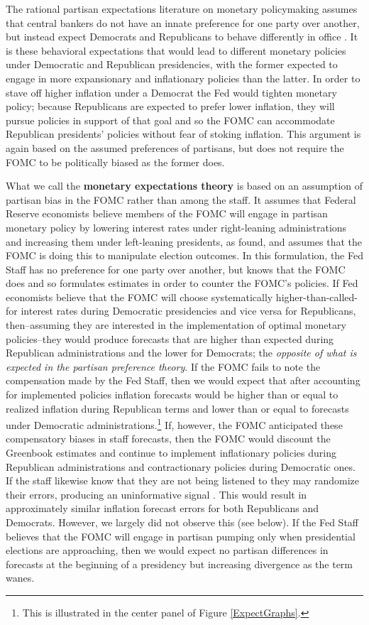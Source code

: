 \documentclass[a4paper]{article}\usepackage{graphicx, color}
\begin{document}
The rational partisan expectations literature on monetary policymaking assumes that central bankers do not have an innate preference for one party over another, but instead expect Democrats and Republicans to behave differently in office \citep{Alesina1991,Hibbs1994}. It is these behavioral expectations that would lead to different monetary policies under Democratic and Republican presidencies, with the former expected to engage in more expansionary and inflationary policies than the latter. In order to stave off higher inflation under a Democrat the Fed would tighten monetary policy; because Republicans are expected to prefer lower inflation, they will pursue policies in support of that goal and so the FOMC can accommodate Republican presidents' policies without fear of stoking inflation. This argument is again based on the assumed preferences of partisans, but does not require the FOMC to be politically biased as the former does. 

What we call the {\bf{monetary expectations theory}} is based on an assumption of partisan bias in the FOMC rather than among the staff. It assumes that Federal Reserve economists believe members of the FOMC will engage in partisan monetary policy by lowering interest rates under right-leaning administrations and increasing them under left-leaning presidents, as \cite{Clark2012} found, and assumes that the FOMC is doing this to manipulate election outcomes. In this formulation, the Fed Staff has no preference for one party over another, but knows that the FOMC does and so formulates estimates in order to counter the FOMC's policies. If Fed economists believe that the FOMC will choose systematically higher-than-called-for interest rates during Democratic presidencies and vice versa for Republicans, then--assuming they are interested in the implementation of optimal monetary policies--they would produce forecasts that are higher than expected during Republican administrations and the lower for Democrats; the {\emph{opposite of what is expected in the partisan preference theory}}. If the FOMC fails to note the compensation made by the Fed Staff, then we would expect that after accounting for implemented policies inflation forecasts would be higher than or equal to realized inflation during Republican terms and lower than or equal to forecasts under Democratic administrations.\footnote{This is illustrated in the center panel of Figure \ref{ExpectGraphs}.} If, however, the FOMC anticipated these compensatory biases in staff forecasts, then the FOMC would discount the Greenbook estimates and continue to implement inflationary policies during Republican administrations and contractionary policies during Democratic ones. If the staff likewise know that they are not being listened to they may randomize their errors, producing an uninformative signal \citep{Crawford1982}. This would result in approximately similar inflation forecast errors for both Republicans and Democrats. However, we largely did not observe this (see below). If the Fed Staff believes that the FOMC will engage in partisan pumping only when presidential elections are approaching, then we would expect no partisan differences in forecasts at the beginning of a presidency but increasing divergence as the term wanes.
\end{document}

